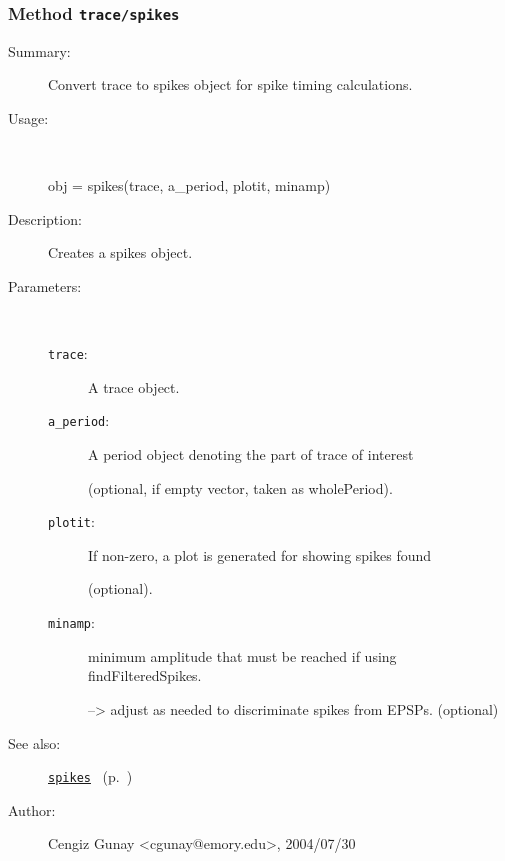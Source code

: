 \subsubsection[Method \texttt{spikes}]{Method \texttt{trace/spikes}}%
%
\label{ref_trace__spikes}%
\hypertarget{ref_trace__spikes}{}%
\begin{description}
\item[Summary:]Convert trace to spikes object for spike timing calculations.
%
\item[Usage:]~%
\begin{lyxcode}%
obj = spikes(trace, a\_period, plotit, minamp)
%
\end{lyxcode}%
%
\item[Description:]%
Creates a spikes object.
\item[Parameters:]~
\begin{description}%
\item[\texttt{trace}:]
 A trace object.
\item[\texttt{a\_period}:]
 A period object denoting the part of trace of interest 

(optional, if empty vector, taken as wholePeriod).\item[\texttt{plotit}:]
 If non-zero, a plot is generated for showing spikes found

(optional).\item[\texttt{minamp}:]
 minimum amplitude that must be reached if using findFilteredSpikes.

--> adjust as needed to discriminate spikes from EPSPs.
(optional)\end{description}%
%
%
%
\item[See also:]%
\hyperlink{ref_spikes}{\texttt{spikes}}%
\ (p.~\pageref{ref_spikes})%
%
%
\item[Author:]%
Cengiz Gunay <cgunay@emory.edu>, 2004/07/30%
\end{description}
\methodline%
